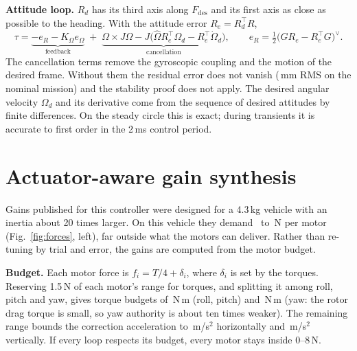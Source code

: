 \documentclass[10pt,a4paper]{scrartcl}
\newcommand{\RuleSection}[1]{%
    \section{#1}%
    \vspace{0.2em}{\color{accent!35}\hrule height 0.4pt}\vspace{0.3em}%
  }
\begin{document}
  \textbf{Attitude loop.} $R_d$ has its third axis along $F_{\mathrm{des}}$ and its first axis as
  close as possible to the heading. With the attitude error $R_e = R_d^\top R$,
  \begin{equation}
    \tau = \underbrace{-e_R - K_\Omega e_\Omega}_{\text{feedback}}
           \;+\; \underbrace{\Omega\times J\Omega - J\bigl(\hat\Omega R_e^\top\Omega_d - R_e^\top\dot\Omega_d\bigr)}_{\text{cancellation}},
    \qquad e_R = \tfrac12\bigl(GR_e - R_e^\top G\bigr)^\vee .
  \end{equation}
  The cancellation terms remove the gyroscopic coupling and the motion of the desired frame.
  Without them the residual error does not vanish (\RPdRms\,mm RMS on the nominal mission) and
  the stability proof does not apply. The desired angular velocity $\Omega_d$ and its derivative
  come from the sequence of desired attitudes by finite differences. On the steady circle this is
  exact; during transients it is accurate to first order in the 2\,ms control period.

  \RuleSection{Actuator-aware gain synthesis}
  \label{sec:lmi}

  Gains published for this controller were designed for a 4.3\,kg vehicle with an inertia about
  20 times larger. On this vehicle they demand \RPaperFMin\ to \RPaperFMax\,N per motor
  (Fig.~\ref{fig:forces}, left), far outside what the motors can deliver. Rather than re-tuning by
  trial and error, the gains are computed from the motor budget.

  \textbf{Budget.} Each motor force is $f_i = T/4 + \delta_i$, where $\delta_i$ is set by the
  torques. Reserving 1.5\,N of each motor's range for torques, and splitting it among roll,
  pitch and yaw, gives torque budgets of \RTauBudgetXY\,N\,m (roll, pitch) and \RTauBudgetZ\,N\,m
  (yaw: the rotor drag torque is small, so yaw authority is about ten times weaker). The remaining
  range bounds the correction acceleration to \RAccelBudgetXY\,m/s$^2$ horizontally and
  \RAccelBudgetZ\,m/s$^2$ vertically. If every loop respects its budget, every motor stays
  inside 0--8\,N.
\end{document}

